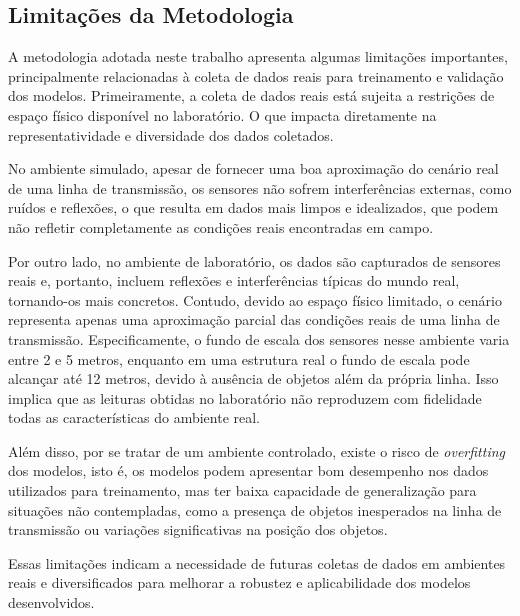 \subsection{Limitações da Metodologia}

A metodologia adotada neste trabalho apresenta algumas limitações importantes, principalmente relacionadas à coleta de dados reais para treinamento e validação dos modelos. Primeiramente, a coleta de dados reais está sujeita a restrições de espaço físico disponível no laboratório. O que impacta diretamente na representatividade e diversidade dos dados coletados.

No ambiente simulado, apesar de fornecer uma boa aproximação do cenário real de uma linha de transmissão, os sensores não sofrem interferências externas, como ruídos e reflexões, o que resulta em dados mais limpos e idealizados, que podem não refletir completamente as condições reais encontradas em campo.

Por outro lado, no ambiente de laboratório, os dados são capturados de sensores reais e, portanto, incluem reflexões e interferências típicas do mundo real, tornando-os mais concretos. Contudo, devido ao espaço físico limitado, o cenário representa apenas uma aproximação parcial das condições reais de uma linha de transmissão. Especificamente, o fundo de escala dos sensores nesse ambiente varia entre 2 e 5 metros, enquanto em uma estrutura real o fundo de escala pode alcançar até 12 metros, devido à ausência de objetos além da própria linha. Isso implica que as leituras obtidas no laboratório não reproduzem com fidelidade todas as características do ambiente real.

Além disso, por se tratar de um ambiente controlado, existe o risco de \textit{overfitting} dos modelos, isto é, os modelos podem apresentar bom desempenho nos dados utilizados para treinamento, mas ter baixa capacidade de generalização para situações não contempladas, como a presença de objetos inesperados na linha de transmissão ou variações significativas na posição dos objetos.

Essas limitações indicam a necessidade de futuras coletas de dados em ambientes reais e diversificados para melhorar a robustez e aplicabilidade dos modelos desenvolvidos.




